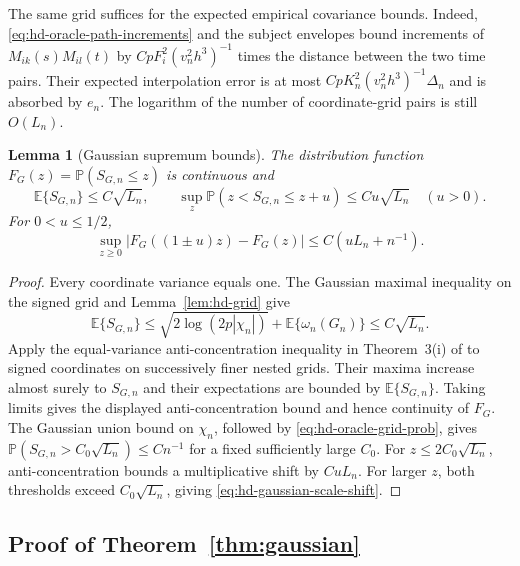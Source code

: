 \documentclass[10pt]{book}
\newtheorem{lemma}{Lemma}
\newcommand{\expect}{\mathbb{E}}
\newcommand{\prob}{\mathbb{P}}
\numberwithin{equation}{section}
\begin{document}
The same grid suffices for the expected empirical covariance bounds.
Indeed, \eqref{eq:hd-oracle-path-increments} and the subject envelopes
bound increments of $M_{ik}(s)M_{il}(t)$ by
$CpF_i^2(v_n^2h^3)^{-1}$ times the distance between the two
time pairs. Their expected interpolation error is at most
$CpK_n^2(v_n^2h^3)^{-1}\Delta_n$ and is absorbed by $e_n$.
The logarithm of the number of coordinate-grid pairs is still $O(L_n)$.

\begin{lemma}[Gaussian supremum bounds]
\label{lem:hd-gaussian-supremum}
The distribution function $F_G(z)=\prob(S_{G,n}\le z)$ is continuous and
\[
 \expect\{S_{G,n}\}\le C\sqrt{L_n},\qquad
 \sup_z\prob(z<S_{G,n}\le z+u)\le Cu\sqrt{L_n}\quad(u>0).
\]
For $0<u\le1/2$,
\begin{equation}
 \sup_{z\ge0}|F_G((1\pm u)z)-F_G(z)|
 \le C(uL_n+n^{-1}).
 \label{eq:hd-gaussian-scale-shift}
\end{equation}
\end{lemma}

\begin{proof}
Every coordinate variance equals one. The Gaussian maximal inequality
on the signed grid and Lemma~\ref{lem:hd-grid} give
\[
\expect\{S_{G,n}\}\le\sqrt{2\log(2p|\chi_n|)}+\expect\{\omega_n(G_n)\}
 \le C\sqrt{L_n}.
\]
Apply the equal-variance anti-concentration inequality in Theorem~3(i)
of \citet{chernozhukov_comparison_2015} to signed coordinates on
successively finer nested grids. Their maxima increase almost surely
to $S_{G,n}$ and their expectations are bounded by $\expect\{S_{G,n}\}$.
Taking limits gives the displayed anti-concentration bound and hence
continuity of $F_G$.
The Gaussian union bound on $\chi_n$, followed by
\eqref{eq:hd-oracle-grid-prob}, gives
$\prob(S_{G,n}>C_0\sqrt{L_n})\le Cn^{-1}$ for a fixed sufficiently large
$C_0$. For $z\le2C_0\sqrt{L_n}$, anti-concentration bounds a
multiplicative shift by $CuL_n$. For larger $z$, both thresholds
exceed $C_0\sqrt{L_n}$, giving \eqref{eq:hd-gaussian-scale-shift}.
\end{proof}

\subsection{Proof of Theorem~\ref{thm:gaussian}}
\end{document}
